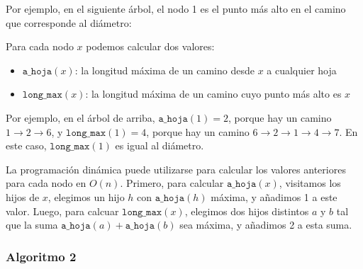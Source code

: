 Por ejemplo, en el siguiente árbol, el nodo 1 es el punto más alto
en el camino que corresponde al diámetro:
\begin{center}
\end{center}

Para cada nodo $x$ podemos calcular dos valores:
\begin{itemize}
    \item $\texttt{a\_hoja}(x)$: la longitud máxima de un camino
          desde $x$ a cualquier hoja
    \item $\texttt{long\_max}(x)$: la longitud máxima de un camino
          cuyo punto más alto es $x$
\end{itemize}

Por ejemplo, en el árbol de arriba, $\texttt{a\_hoja}(1)=2$, porque
hay un camino $1 \rightarrow 2 \rightarrow 6$, y $\texttt{long\_max}(1)=4$,
porque hay un camino
$6 \rightarrow 2 \rightarrow 1 \rightarrow 4 \rightarrow 7$.
En este caso, $\texttt{long\_max}(1)$ es igual al diámetro.

La programación dinámica puede utilizarse para calcular los valores
anteriores para cada nodo en $O(n)$. Primero, para calcular
$\texttt{a\_hoja}(x)$, visitamos los hijos de $x$, elegimos un hijo $h$
con $\texttt{a\_hoja}(h)$ máxima, y añadimos 1 a este valor.
Luego, para calcuar $\texttt{long\_max}(x)$, elegimos dos hijos distintos
$a$ y $b$ tal que la suma $\texttt{a\_hoja}(a)+\texttt{a\_hoja}(b)$
sea máxima, y añadimos 2 a esta suma.

\subsubsection{Algoritmo 2}

